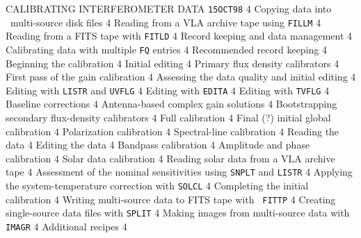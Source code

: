      {CALIBRATING INTERFEROMETER DATA%
}                    {{\tt 15OCT98}\hskip 0.6cm 4}
   {Copying data into \AIPS\ multi-source disk
                     files}                                   {4}
 {Reading from a VLA archive tape using
                     {\tt FILLM}}                             {4}
 {Reading from a FITS tape with {\tt FITLD}}   {4}
   {Record keeping and data management}          {4}
 {Calibrating data with multiple {\tt FQ}
                     entries}                                 {4}
 {Recommended record keeping}                  {4}
   {Beginning the calibration}                   {4}
 {Initial editing}                             {4}
 {Primary flux density calibrators}            {4}
 {First pass of the gain calibration}          {4}
   {Assessing the data quality and initial
                     editing}                                 {4}
 {Editing with {\tt LISTR} and {\tt UVFLG}}    {4}
 {Editing with {\tt EDITA}}                    {4}
 {Editing with {\tt TVFLG}}                    {4}
 {Baseline corrections}                        {4}
   {Antenna-based complex gain solutions}        {4}
 {Bootstrapping secondary flux-density
                     calibrators}                             {4}
 {Full calibration}                            {4}
 {Final (?) initial global calibration}        {4}
   {Polarization calibration}                    {4}
   {Spectral-line calibration}                   {4}
 {Reading the data}                            {4}
 {Editing the data}                            {4}
 {Bandpass calibration}                        {4}
 {Amplitude and phase calibration}             {4}
   {Solar data calibration}                      {4}
 {Reading solar data from a VLA archive tape}  {4}
 {Assessment of the nominal sensitivities using
                     {\tt SNPLT} and {\tt LISTR}}             {4}
 {Applying the system-temperature correction with
                     {\tt SOLCL}}                             {4}
   {Completing the initial calibration}          {4}
 {Writing multi-source data to FITS tape with {\tt
                     FITTP}}                                  {4}
 {Creating single-source data files with
                     {\tt SPLIT}}                             {4}
 {Making images from multi-source data with
                     {\tt IMAGR}}                             {4}
  {Additional recipes}                          {4}

